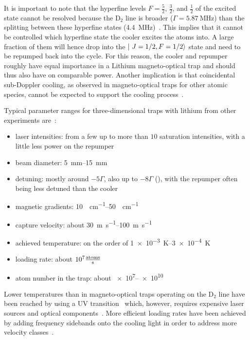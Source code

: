 It is important to note that the hyperfine levels $F = \frac{5}{2}$, $\frac{3}{2}$, and $\frac{1}{2}$ of the excited state cannot be resolved because the D$_2$ line is broader ($\Gamma = \SI[]{5.87}{\mega\hertz}$) than the splitting between these hyperfine states (\SI[]{4.4}{\mega\hertz})~\cite{gehm_properties_2003}. This implies that it cannot be controlled which hyperfine state the cooler excites the atoms into. A large fraction of them will hence drop into the $\Ket{~J=1/2, F=1/2}$ state and need to be repumped back into the cycle. For this reason, the cooler and repumper roughly have equal importance in a Lithium magneto-optical trap and should thus also have on comparable power. Another implication is that coincidental sub-Doppler cooling, as observed in magneto-optical traps for other atomic species, cannot be expected to support the cooling process~\cite{grier_lambda-enhanced_2013}.

Typical parameter ranges for three-dimensional traps with lithium from other experiments are~\cite{
    tiecke_high-flux_2009,
    kawanaka_decay_1993,
    schunemann_magneto-optic_1998,
    mewes_simultaneous_1999,
    hilker_laser_2012,
    kerkmann_novel_2019,
    ladouceur_compact_2009,
    chen_lithium-cesium_2021,    
    burchianti_efficient_2014,
    li_enhanced_2015,
}:
\begin{itemize}
    \item laser intensities: from a few up to more than $10$ saturation intensities, with a little less power on the repumper
    \item beam diameter: \SIrange{5}{15}{\milli\meter}
    \item detuning: mostly around $-5\Gamma$, also up to $-8 \Gamma$ (\cite{li_enhanced_2015}), with the repumper often being less detuned than the cooler
    \item magnetic gradients: \SIrange{10}{50}{\gauss\per\centi\meter}
    \item capture velocity: about \SIrange[]{30}{100}{\meter\per\second} 
    \item achieved temperature: on the order of \SIrange{1e-3}{3e-4}{\kelvin}
    \item loading rate: about $\SI[]{e7}{} \frac{\text{atoms}}{\si[]{\second}}$
    \item atom number in the trap: about \SIrange{e7}{e10}{}
\end{itemize}

Lower temperatures than in magneto-optical traps operating on the D$_2$ line have been reached by using a UV transition~\cite{duarte_all-optical_2011,omran_microscopic_2015} which, however, requires expensive laser sources and optical components~\cite{burchianti_efficient_2014}. More efficient loading rates have been achieved by adding frequency sidebands onto the cooling light in order to address more velocity classes~\cite{li_enhanced_2015}.

